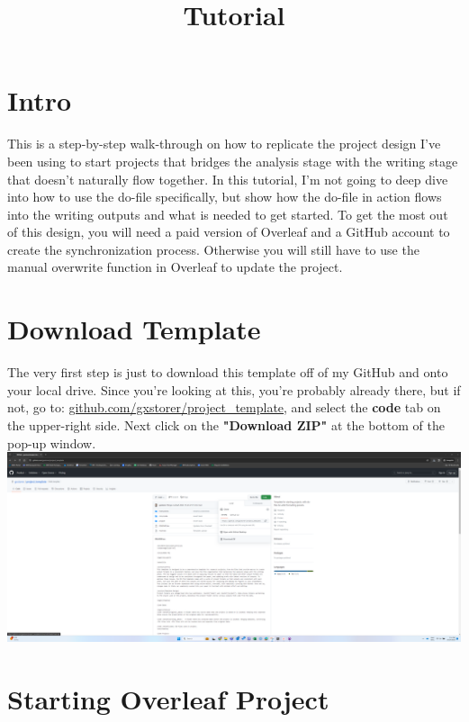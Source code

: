 \documentclass[12pt]{article}
\title{Tutorial}
\begin{document}
\maketitle

\section{Intro}

This is a step-by-step walk-through on how to replicate the project design I've been using to start projects that bridges the analysis stage with the writing stage that doesn't naturally flow together. 
In this tutorial, I'm not going to deep dive into how to use the do-file specifically, but show how the do-file in action flows into the writing outputs and what is needed to get started. 
To get the most out of this design, you will need a paid version of Overleaf and a GitHub account to create the synchronization process. 
Otherwise you will still have to use the manual overwrite function in Overleaf to update the project.

\section{Download Template}

The very first step is just to download this template off of my GitHub and onto your local drive. Since you're looking at this, you're probably already there, but if not, go to: \href{https://github.com/gxstorer/project_template}{\underline{github.com/gxstorer/project\_template}}, and select the \textbf{code} tab on the upper-right side. Next click on the \textbf{"Download ZIP"} at the bottom of the pop-up window. \\


\includegraphics[width=1\linewidth]{Instructions/project_template_screenshots/project_template_001.png} \\

\section{Starting Overleaf Project}
\end{document}
